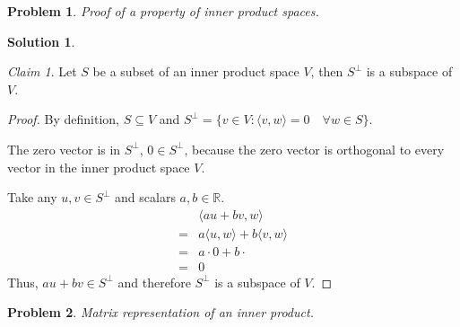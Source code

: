 \documentclass{article}
\newtheorem{problem}{Problem}
\theoremstyle{definition}
\newtheorem*{solution}{Solution}
\theoremstyle{remark}
\newtheorem*{theorem}{Claim}
\begin{document}
\begin{problem}

Proof of a property of inner product spaces.

\end{problem}

\begin{solution}

\begin{theorem}
Let $S$ be a subset of an inner product space $V$, then $S^\perp$ is a subspace of $V$.
\end{theorem}
\begin{proof}
By definition, $S\subseteq V$ and $S^\perp=\{v\in V:\langle v,w \rangle =0 \quad \forall w\in S\}$.

The zero vector is in $S^\perp$, $0\in S^\perp$, because the zero vector is orthogonal to every vector in the inner product space $V$.

Take any $u,v\in S^\perp$ and scalars $a,b\in \mathbb{R}$.
\begin{align*}
  & \langle au+bv,w \rangle \\
= & a\langle u, w \rangle + b\langle v, w \rangle \\
= & a\cdot 0 + b\cdot \\
= & 0
\end{align*}
Thus, $au+bv\in S^\perp$ and therefore $S^\perp$ is a subspace of $V$.
\end{proof}

\end{solution}

\begin{problem}

Matrix representation of an inner product.

\end{problem}
\end{document}

